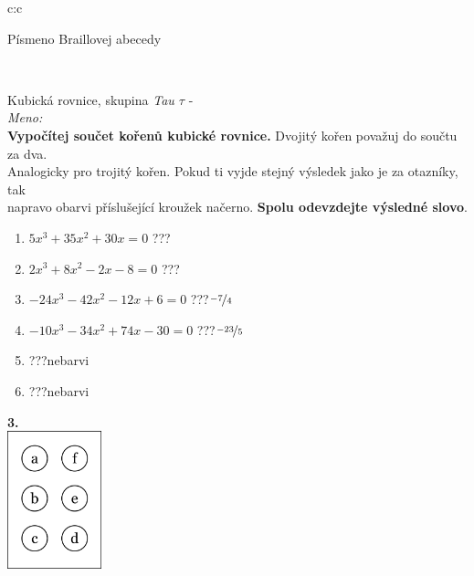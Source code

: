 \documentclass[10pt]{report}
\begin{document}
\begin{tabular}{c:c}
\begin{minipage}[c][99mm][t]{0.49\linewidth}
\begin{center}
\begin{minipage}{0.20\linewidth}
\begin{center}
{\small Písmeno Braillovej abecedy}
\end{center}
\end{minipage}
\end{center}
\end{minipage}
\\ \hdashline
\begin{minipage}[c][99mm][t]{0.49\linewidth}
\begin{center}
\vspace{7mm}
{\huge Kubická rovnice, skupina \textit{Tau $\tau$} -}\\[4.5mm]
\textit{Meno:}\phantom{xxxxxxxxxxxxxxxxxxxxxxxxxxxxxxxxxxxxxxxxxxxxxxxxxxxxxxxxxxxxxxxxx}\\[3.5mm]
\textbf{Vypočítej součet kořenů kubické rovnice.} Dvojitý kořen považuj do součtu za dva.\\Analogicky pro trojitý kořen. Pokud ti vyjde stejný výsledek jako je za otazníky, tak\\napravo obarvi příslušející kroužek načerno. \textbf{Spolu odevzdejte výsledné slovo}.\\[3mm]
\begin{minipage}{0.77\linewidth}
\begin{center}
\begin{varwidth}{\textwidth}
\begin{enumerate}
\large
\item $5x^3+35x^2+30x=0$\quad \dotfill\; ???\;\dotfill {}
\item $2x^3+8x^2-2x-8=0$\quad \dotfill\; ???\;\dotfill {}
\item $-24x^3-42x^2-12x+6=0$\quad \dotfill\; ???\;\dotfill \quad $\nicefrac{-7}{4}$
\item $-10x^3-34x^2+74x-30=0$\quad \dotfill\; ???\;\dotfill \quad $\nicefrac{-23}{5}$
\item \quad \dotfill\; ???\;\dotfill \quad nebarvi
\item \quad \dotfill\; ???\;\dotfill \quad nebarvi
\end{enumerate}
\end{varwidth}
\end{center}
\end{minipage}
\begin{minipage}{0.20\linewidth}
\begin{center}
{\Huge\bfseries 3.} \\[2mm]
\includegraphics[height=40mm]{../images/braille.png}

\end{center}
\end{minipage}
\end{center}
\end{minipage}
\end{tabular}
\end{document}
